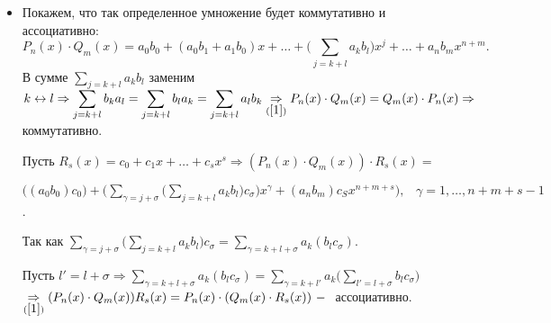 \begin{itemize}
    \item Покажем, что так определенное умножение будет коммутативно и ассоциативно:
    $$P_n(x)\cdot Q_m(x)=a_0b_0+(a_0b_1+a_1b_0)x+\dots+\Big(\displaystyle\sum_{j=k+l}a_kb_l \Big)x^j+\dots+a_nb_mx^{n+m}.$$
    В сумме $\displaystyle\sum_{j=k+l}a_kb_l $ заменим $k\leftrightarrow l\Rightarrow \displaystyle\sum_{j=k+l}b_ka_l=\displaystyle\sum_{j=k+l}b_la_k=\displaystyle\sum_{j=k+l}a_lb_k\underset{(\ref{1})}{\Rightarrow}P_n(x)\cdot Q_m(x)=Q_m(x)\cdot P_n(x)\Rightarrow$ коммутативно.\par
    Пусть $R_s(x)=c_0+c_1x+\dots+c_sx^s\Rightarrow(P_n(x)\cdot Q_m(x))\cdot R_s(x)=$\par $\big((a_0b_0)c_0\big)+\Big(\displaystyle\sum_{\gamma=j+\sigma}\Big(\displaystyle\sum_{j=k+l}a_kb_l\Big)c_\sigma\Big)x^\gamma + (a_nb_m)c_Sx^{n+m+s}), \;\;\;\gamma=1, \dots, n+m+s-1$.\par Так как $\displaystyle\sum_{\gamma=j+\sigma}\Big(\displaystyle\sum_{j=k+l}a_kb_l\Big)c_\sigma = \displaystyle\sum_{\gamma=k+l+\sigma}a_k(b_lc_\sigma)$.
    
    Пусть $l'=l+\sigma\Rightarrow\displaystyle\sum_{\gamma=k+l+\sigma}a_k(b_lc_\sigma) =\displaystyle\sum_{\gamma=k+l'}a_k\Big(\displaystyle\sum_{l'=l+\sigma}b_lc_\sigma\Big)$ 
    $\underset{(\ref{1})}{\Rightarrow} (P_n(x)\cdot Q_m(x) )R_s(x)=P_n(x)\cdot(Q_m(x)\cdot R_s(x))~-~$ ассоциативно.
    

\end{itemize}
